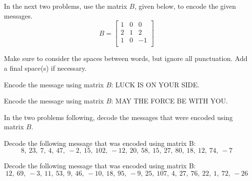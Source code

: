 In the next two problems, use the matrix $B$, given below, to encode the given messages.
\[
    B = \begin{bmatrix}
        1 & 0 & 0  \\
        2 & 1 & 2  \\
        1 & 0 & -1 \\
    \end{bmatrix}
\]

Make sure to consider the spaces between words, but ignore all punctuation. Add a final space(s) if
necessary.

\begin{puzzle}
    Encode the message using matrix $B$:
    LUCK IS ON YOUR SIDE.
\end{puzzle}


\begin{puzzle}
    Encode the message using matrix $B$:
    MAY THE FORCE BE WITH YOU.
\end{puzzle}

In the two problems following, decode the messages that were encoded using matrix $B$.

\begin{puzzle}
    Decode the following message that was encoded using matrix B:
    \[
        8,~ 23,~ 7,~ 4,~ 47,~ -2,~ 15,~ 102,~ -12,~ 20,~ 58,~ 15,~ 27,~ 80,~ 18,~ 12,~ 74,~ -7
    \]
\end{puzzle}

\begin{puzzle}
    Decode the following message that was encoded using matrix B:
    \[
        12,~ 69,~ -3,~ 11,~ 53,~ 9,~ 46,~ -10,~ 18,~ 95,~ -9,~ 25,~ 107,~ 4,~ 27,~ 76,~ 22,~ 1,~ 72,~ -26
    \]
\end{puzzle}




